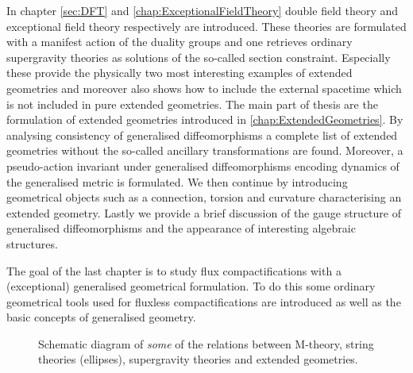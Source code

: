 In chapter \ref{sec:DFT} and \ref{chap:ExceptionalFieldTheory} double field theory and exceptional field theory respectively are introduced. These theories are formulated with a manifest action of the duality groups and one retrieves ordinary supergravity theories as solutions of the so-called section constraint. Especially these provide the physically two most interesting examples of extended geometries and moreover also shows how to include the external spacetime which is not included in pure extended geometries. The main part of thesis are the formulation of extended geometries introduced in \ref{chap:ExtendedGeometries}. By analysing consistency of generalised diffeomorphisms a complete list of extended geometries without the so-called ancillary transformations are found. Moreover, a pseudo-action invariant under generalised diffeomorphisms encoding dynamics of the generalised metric is formulated. We then continue by introducing geometrical objects such as a connection, torsion and curvature characterising an extended geometry. Lastly we provide a brief discussion of the gauge structure of generalised diffeomorphisms and the appearance of interesting algebraic structures. 

The goal of the last chapter is to study flux compactifications with a (exceptional) generalised geometrical formulation. To do this some ordinary geometrical tools used for fluxless compactifications are introduced as well as the basic concepts of generalised geometry. %





\begin{figure}
    \caption{Schematic diagram of \emph{some} of the relations between M-theory, string theories (ellipses), supergravity theories and extended geometries.}
    \label{fig:TheGodFather}
\end{figure}


